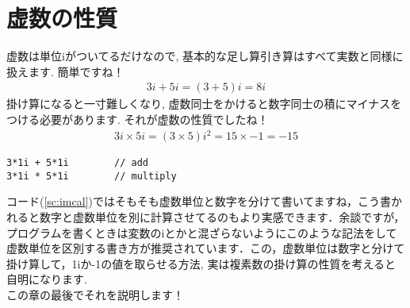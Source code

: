\documentclass[11pt,a4paper]{ujreport}
\begin{document}
\section{虚数の性質}
虚数は単位iがついてるだけなので, 基本的な足し算引き算はすべて実数と同様に扱えます. 簡単ですね！\\
\begin{eqnarray}
\label{eq:implus}
3i + 5i  =(3 + 5)i = 8i
\end{eqnarray}
掛け算になると一寸難しくなり, 虚数同士をかけると数字同士の積にマイナスをつける必要があります. それが虚数の性質でしたね！\\
\begin{eqnarray}
\label{eq:imkake}
3i \times 5i = (3\times 5)i^2 = 15 \times -1 = -15
\end{eqnarray}


\begin{lstlisting}[caption=式(\ref{eq:implus} \ref{eq:imkake})あたりのコード,label=sc:imcal , keepspaces=true]
3*1i + 5*1i        // add
3*1i * 5*1i        // multiply
\end{lstlisting}

コード(\ref{sc:imcal})ではそもそも虚数単位と数字を分けて書いてますね，こう書かれると数字と虚数単位を別に計算させてるのもより実感できます．余談ですが，プログラムを書くときは変数のiとかと混ざらないようにこのような記法をして虚数単位を区別する書き方が推奨されています．この，虚数単位は数字と分けて掛け算して，1iか-1の値を取らせる方法, 実は複素数の掛け算の性質を考えると自明になります.\\
この章の最後でそれを説明します！\\
\end{document}
